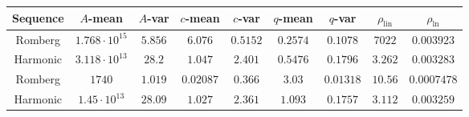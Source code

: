 \begin{table}[H]
    \centering
    \small
    \begin{tabular}{c||c|c|c|c|c|c|c|c}
Sequence & \(A\)-mean & \(A\)-var & \(c\)-mean & \(c\)-var & \(q\)-mean & \(q\)-var & \(\rho_{\operatorname{lin}}\) & \(\rho_{\ln}\)\\\hline
\rowcolor{red}
Romberg & \(1.768\cdot 10^{15}\) & \(5.856\) & \(6.076\) & \(0.5152\) & \(0.2574\) & \(0.1078\) & \(7022\) & \(0.003923\) \\
\rowcolor{red}
Harmonic & \(3.118\cdot 10^{13}\) & \(28.2\) & \(1.047\) & \(2.401\) & \(0.5476\) & \(0.1796\) & \(3.262\) & \(0.003283\) \\
\rowcolor{red}
Romberg & \(1740\) & \(1.019\) & \(0.02087\) & \(0.366\) & \(3.03\) & \(0.01318\) & \(10.56\) & \(0.0007478\) \\
\rowcolor{red}
Harmonic & \(1.45\cdot 10^{13}\) & \(28.09\) & \(1.027\) & \(2.361\) & \(1.093\) & \(0.1757\) & \(3.112\) & \(0.003259\) \\
    \end{tabular}
    \label{tab:my_label}
\end{table}

